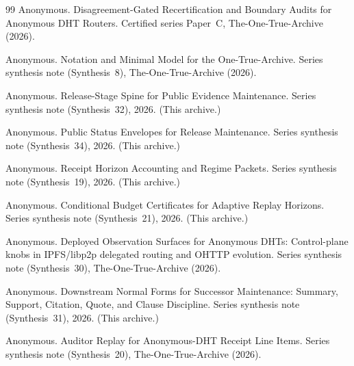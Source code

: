\documentclass[11pt]{article}
\begin{document}
\begin{thebibliography}{99}
Anonymous.
\newblock Disagreement-Gated Recertification and Boundary Audits for Anonymous DHT Routers.
\newblock Certified series Paper~C, The-One-True-Archive (2026).

Anonymous.
\newblock Notation and Minimal Model for the One-True-Archive.
\newblock Series synthesis note (Synthesis~8), The-One-True-Archive (2026).

Anonymous.
\newblock Release-Stage Spine for Public Evidence Maintenance.
\newblock Series synthesis note (Synthesis~32), 2026. (This archive.)

Anonymous.
\newblock Public Status Envelopes for Release Maintenance.
\newblock Series synthesis note (Synthesis~34), 2026. (This archive.)

Anonymous.
\newblock Receipt Horizon Accounting and Regime Packets.
\newblock Series synthesis note (Synthesis~19), 2026. (This archive.)

Anonymous.
\newblock Conditional Budget Certificates for Adaptive Replay Horizons.
\newblock Series synthesis note (Synthesis~21), 2026. (This archive.)

Anonymous.
\newblock Deployed Observation Surfaces for Anonymous DHTs: Control-plane knobs in IPFS/libp2p delegated routing and OHTTP evolution.
\newblock Series synthesis note (Synthesis~30), The-One-True-Archive (2026).

Anonymous.
\newblock Downstream Normal Forms for Successor Maintenance: Summary, Support, Citation, Quote, and Clause Discipline.
\newblock Series synthesis note (Synthesis~31), 2026. (This archive.)

Anonymous.
\newblock Auditor Replay for Anonymous-DHT Receipt Line Items.
\newblock Series synthesis note (Synthesis~20), The-One-True-Archive (2026).

\end{thebibliography}
\end{document}
